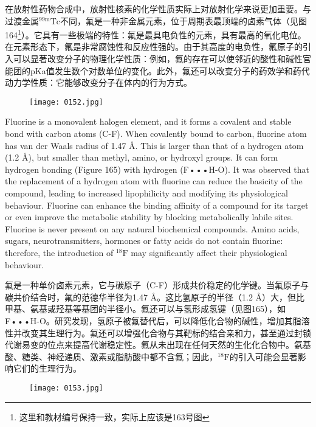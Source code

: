 \documentclass[dvipsnames, svgnames,a4paper,11pt]{article}
\begin{document}
在放射性药物合成中，放射性核素的化学性质实际上对放射化学来说更加重要。与过渡金属\(\mathrm{{}^{99m}Tc}\)不同，氟是一种非金属元素，位于周期表最顶端的卤素气体（见图164\footnote{这里和教材编号保持一致，实际上应该是163号图}）。它具有一些极端的特性：氟是最具电负性的元素，具有最高的氧化电位。在元素形态下，氟是非常腐蚀性和反应性强的。由于其高度的电负性，氟原子的引入可以显著改变分子的物理化学性质：例如，氟的存在可以使邻近的酸性和碱性官能团的pKa值发生数个对数单位的变化。此外，氟还可以改变分子的药效学和药代动力学性质：它能够改变分子在体内的行为方式。

\setcounter{figure}{163}  %

\begin{figure}[h]
	\centering
    \texttt{[image: 0152.jpg]}    
     \label{fig164}
\end{figure}

Fluorine is a monovalent halogen element, and it forms a covalent and stable bond
with carbon atoms (C-F). When covalently bound to carbon, fluorine atom has van
der Waals radius of 1.47 Å. This is larger than that of a hydrogen atom (1.2 Å), but
smaller than methyl, amino, or hydroxyl groups. It can form hydrogen bonding
(Figure 165) with hydrogen (F•••H-O). It was observed that the replacement of a
hydrogen atom with fluorine can reduce the basicity of the compound, leading to
increased lipophilicity and modifying its physiological behaviour. Fluorine can
enhance the binding affinity of a compound for its target or even improve the
metabolic stability by blocking metabolically labile sites. Fluorine is never present on
any natural biochemical compounds. Amino acids, sugars, neurotransmitters,
hormones or fatty acids do not contain fluorine: therefore, the introduction of ${}^\mathrm{18}\mathrm{F}$ may
significantly affect their physiological behaviour.


氟是一种单价卤素元素，它与碳原子（C-F）形成共价稳定的化学键。当氟原子与碳共价结合时，氟的范德华半径为1.47 Å。这比氢原子的半径（1.2 Å）大，但比甲基、氨基或羟基等基团的半径小。氟还可以与氢形成氢键（见图165），如F•••H-O。研究发现，氢原子被氟替代后，可以降低化合物的碱性，增加其脂溶性并改变其生理行为。氟还可以增强化合物与其靶标的结合亲和力，甚至通过封锁代谢易变的位点来提高代谢稳定性。氟从未出现在任何天然的生化化合物中。氨基酸、糖类、神经递质、激素或脂肪酸中都不含氟；因此，${}^\mathrm{18}\mathrm{F}$的引入可能会显著影响它们的生理行为。

\begin{figure}[h]
	\centering
    \texttt{[image: 0153.jpg]}    
     \label{fig165}
\end{figure}
\end{document}
